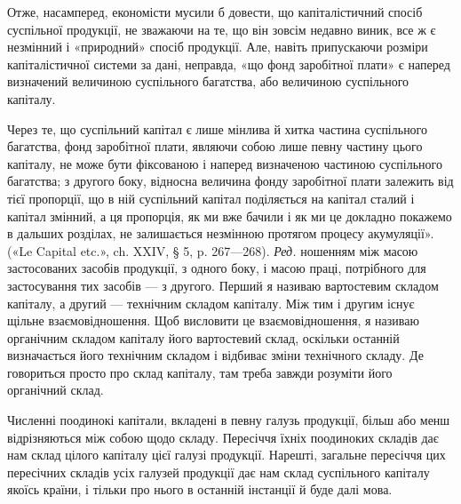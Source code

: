 Отже, насамперед, економісти мусили б довести, що капіталістичний
спосіб суспільної продукції, не зважаючи на те, що він зовсім
недавно виник, все ж є незмінний і «природний» спосіб продукції. Але,
навіть припускаючи розміри капіталістичної системи за дані, неправда,
«що фонд заробітної плати» є наперед визначений величиною суспільного
багатства, або величиною суспільного капіталу.

Через те, що суспільний капітал є лише мінлива й хитка частина
суспільного багатства, фонд заробітної плати, являючи собою лише
певну частину цього капіталу, не може бути фіксованою і наперед визначеною
частиною суспільного багатства; з другого боку, відносна величина
фонду заробітної плати залежить від тієї пропорції, що в ній суспільний
капітал поділяється на капітал сталий і капітал змінний, а ця
пропорція, як ми вже бачили і як ми це докладно покажемо в дальших
розділах, не залишається незмінною протягом процесу акумуляції».
(«Le Capital etc.», ch. XXIV, § 5, p. 267—268). \emph{Ред.}
ношенням між масою застосованих засобів продукції, з одного
боку, і масою праці, потрібного для застосування тих засобів —
з другого. Перший я називаю вартостевим складом капіталу, а
другий — технічним складом капіталу. Між тим і другим існує
щільне взаємовідношення. Щоб висловити це взаємовідношення,
я називаю органічним складом капіталу його вартостевий склад,
оскільки останній визначається його технічним складом і відбиває
зміни технічного складу. Де говориться просто про склад капіталу,
там треба завжди розуміти його органічний склад.

Численні поодинокі капітали, вкладені в певну галузь продукції,
більш або менш відрізняються між собою щодо складу.
Пересіччя їхніх поодиноких складів дає нам склад цілого капіталу
цієї галузі продукції. Нарешті, загальне пересіччя цих пересічних
складів усіх галузей продукції дає нам склад суспільного
капіталу якоїсь країни, і тільки про нього в останній інстанції
й буде далі мова.

